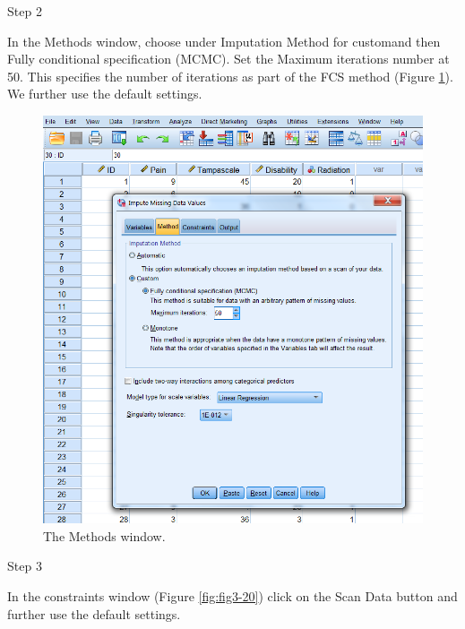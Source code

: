 \documentclass[]{book}
\theoremstyle{definition}
\theoremstyle{definition}
\theoremstyle{definition}
\theoremstyle{remark}
\begin{document}
Step 2

In the Methods window, choose under Imputation Method for customand then
Fully conditional specification (MCMC). Set the Maximum iterations
number at 50. This specifies the number of iterations as part of the FCS
method (Figure \ref{fig:fig3-19}). We further use the default settings.

\begin{figure}

{\centering \includegraphics[width=0.9\linewidth]{images/fig3.19} 

}

\caption{The Methods window.}\label{fig:fig3-19}
\end{figure}

Step 3

In the constraints window (Figure \ref{fig:fig3-20}) click on the Scan
Data button and further use the default settings.
\end{document}
